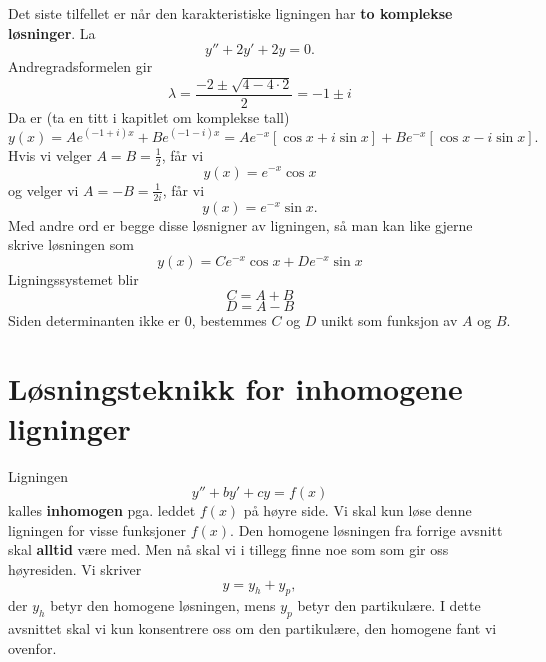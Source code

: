 Det siste tilfellet er n{\aa}r den karakteristiske ligningen har \textbf{to komplekse l{\o}sninger}. La
\begin{equation*}
y'' +2y' + 2y=0.
\end{equation*}
Andregradsformelen gir
\begin{equation*}
\lambda=\frac{-2\pm \sqrt{4-4\cdot 2}}{2}=-1\pm i
\end{equation*}
Da er (ta en titt i kapitlet om komplekse tall)
\begin{equation*}
y(x) = Ae^{(-1+i)x}+Be^{(-1-i)x}=Ae^{-x}[\cos{x}+i\sin{x}]+Be^{-x}[\cos{x}-i\sin{x}].
\end{equation*}
Hvis vi velger $A=B=\frac{1}{2}$, f{\aa}r vi 
\begin{equation*}
y(x)=e^{-x}\cos{x}
\end{equation*}
og velger vi $A=-B=\frac{1}{2i}$, f{\aa}r vi 
\begin{equation*}
y(x)= e^{-x}\sin{x}.
\end{equation*}
Med andre ord er begge disse l{\o}snigner av ligningen, s{\aa} man kan like gjerne skrive l{\o}sningen som
\begin{equation*}
\boxed{y(x) =Ce^{-x}\cos{x}+De^{-x}\sin{x}}
\end{equation*}
Ligningssystemet blir
\begin{equation*}
C=A+B
\end{equation*}
\begin{equation*}
D=A-B
\end{equation*}
Siden determinanten ikke er 0, bestemmes $C$ og $D$ unikt som funksjon av $A$ og $B$.

\section*{Løsningsteknikk for inhomogene ligninger}
Ligningen 
\begin{equation*}
y'' +by' + cy=f(x)
\end{equation*}
kalles \textbf{inhomogen} pga. leddet $f(x)$ p{\aa} h{\o}yre side. Vi skal kun l{\o}se denne ligningen for visse funksjoner $f(x)$. 
Den homogene l{\o}sningen fra forrige avsnitt skal \textbf{alltid} v{\ae}re med. Men n{\aa} skal vi i tillegg finne noe som som gir oss h{\o}yresiden. Vi skriver
\begin{equation*}
y=y_{h}+y_{p},
\end{equation*}
der $y_{h}$ betyr den homogene l{\o}sningen, mens $y_{p}$ betyr den partikul{\ae}re. I dette avsnittet skal vi kun konsentrere oss om den partikul{\ae}re, den homogene fant vi
ovenfor.

